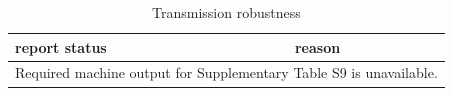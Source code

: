 \begin{table}[htbp]
\centering
\caption{Transmission robustness}
\label{tab:s9}
\begin{tabular}{ll}
\hline
report status & reason \\
\hline
\multicolumn{2}{l}{Required machine output for Supplementary Table S9 is unavailable.} \\
\hline
\end{tabular}
\end{table}
